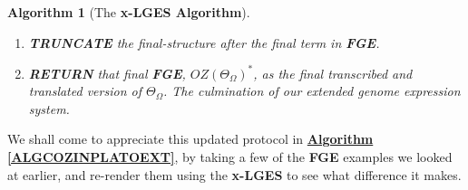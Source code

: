 \documentclass[a4paper, 18pt]{book} %
\newtheorem{alg}{Algorithm}
\begin{document}
\begin{alg}[The \textbf{x-LGES Algorithm}]
\begin{enumerate}
{Then, \textbf{USE} the \textbf{IFA MSS} from \textbf{Step\#1}/\textbf{\hyperref[ALGCOZINPLATO]{Algorithm \ref{ALGCOZINPLATO}}}, that is $\overset{>}{OZ(\Theta_\Omega)}$, as the \textbf{Genome Expression Suffix (GES)} to extend the current \textbf{FGE} so that

\begin{equation}
\label{EQTRANSLGENSEQEXT}
\boxed{OZ(\Theta_\Omega)}^* = OZ(\Theta_\Omega)\cdot\boxed{OZ(\Theta_\Omega)}\cdot\overset{>}{OZ(\Theta_\Omega)}
\end{equation}\\

Which, if qualified with the necessary encoding bases is as such:

\begin{equation}
\label{EQTRANSLGENSEQEXTQUAL}
\boxed{OZ(\Theta_\Omega)}^* = OZ(\Theta_\Omega)_{oz}\cdot\boxed{OZ(\Theta_\Omega)}_{pf}\cdot\overset{>}{OZ(\Theta_\Omega)}_{oz}
\end{equation}

And if we express this as the update to \textbf{\hyperref[EQEXTFGEJOINTEXT]{Equation \ref{EQEXTFGEJOINTEXT}}}, we have:

\begin{equation}
		\label{EQEXTFGEJOINTEXT_B}
		\boxed{OZ(\Theta_\Omega)}^* = \boxed{OZ(\Theta_\Omega)}^* \cdot \boxed{\omega_i^*}_{joint} \cdot\overset{>}{OZ(\Theta_\Omega)}_{oz}
		\end{equation}	
		
		Which tells us that the final \textbf{FGE} is the original \textbf{FGE} extended with just one extra JOINT and the \textbf{GES}/\textbf{IFA MSS} encoded in base-OZIN.

}
\item \textbf{TRUNCATE} the final-structure after the final term in \textbf{FGE}.
\item \textbf{RETURN} that final \textbf{FGE}, $\boxed{OZ(\Theta_\Omega)}^*$, as the final transcribed and translated version of $\Theta_\Omega$. The culmination of our extended genome expression system.
\end{enumerate}
\end{alg}


We shall come to appreciate this updated protocol in \textbf{\hyperref[ALGCOZINPLATOEXT]{Algorithm \ref{ALGCOZINPLATOEXT}}}, by taking a few of the \textbf{FGE} examples we looked at earlier, and re-render them using the \textbf{x-LGES} to see what difference it makes.
\end{document}
